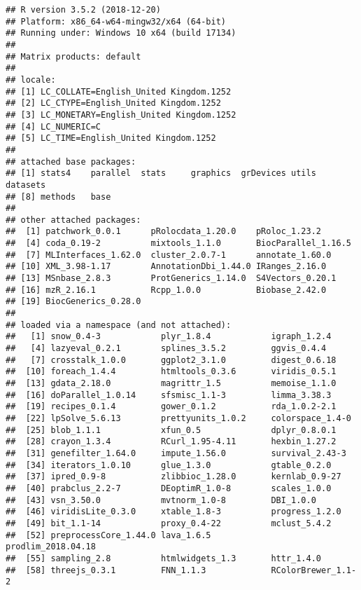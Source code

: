 \documentclass[]{article}
\begin{document}
\begin{verbatim}
## R version 3.5.2 (2018-12-20)
## Platform: x86_64-w64-mingw32/x64 (64-bit)
## Running under: Windows 10 x64 (build 17134)
## 
## Matrix products: default
## 
## locale:
## [1] LC_COLLATE=English_United Kingdom.1252 
## [2] LC_CTYPE=English_United Kingdom.1252   
## [3] LC_MONETARY=English_United Kingdom.1252
## [4] LC_NUMERIC=C                           
## [5] LC_TIME=English_United Kingdom.1252    
## 
## attached base packages:
## [1] stats4    parallel  stats     graphics  grDevices utils     datasets 
## [8] methods   base     
## 
## other attached packages:
##  [1] patchwork_0.0.1      pRolocdata_1.20.0    pRoloc_1.23.2       
##  [4] coda_0.19-2          mixtools_1.1.0       BiocParallel_1.16.5 
##  [7] MLInterfaces_1.62.0  cluster_2.0.7-1      annotate_1.60.0     
## [10] XML_3.98-1.17        AnnotationDbi_1.44.0 IRanges_2.16.0      
## [13] MSnbase_2.8.3        ProtGenerics_1.14.0  S4Vectors_0.20.1    
## [16] mzR_2.16.1           Rcpp_1.0.0           Biobase_2.42.0      
## [19] BiocGenerics_0.28.0 
## 
## loaded via a namespace (and not attached):
##   [1] snow_0.4-3            plyr_1.8.4            igraph_1.2.4         
##   [4] lazyeval_0.2.1        splines_3.5.2         ggvis_0.4.4          
##   [7] crosstalk_1.0.0       ggplot2_3.1.0         digest_0.6.18        
##  [10] foreach_1.4.4         htmltools_0.3.6       viridis_0.5.1        
##  [13] gdata_2.18.0          magrittr_1.5          memoise_1.1.0        
##  [16] doParallel_1.0.14     sfsmisc_1.1-3         limma_3.38.3         
##  [19] recipes_0.1.4         gower_0.1.2           rda_1.0.2-2.1        
##  [22] lpSolve_5.6.13        prettyunits_1.0.2     colorspace_1.4-0     
##  [25] blob_1.1.1            xfun_0.5              dplyr_0.8.0.1        
##  [28] crayon_1.3.4          RCurl_1.95-4.11       hexbin_1.27.2        
##  [31] genefilter_1.64.0     impute_1.56.0         survival_2.43-3      
##  [34] iterators_1.0.10      glue_1.3.0            gtable_0.2.0         
##  [37] ipred_0.9-8           zlibbioc_1.28.0       kernlab_0.9-27       
##  [40] prabclus_2.2-7        DEoptimR_1.0-8        scales_1.0.0         
##  [43] vsn_3.50.0            mvtnorm_1.0-8         DBI_1.0.0            
##  [46] viridisLite_0.3.0     xtable_1.8-3          progress_1.2.0       
##  [49] bit_1.1-14            proxy_0.4-22          mclust_5.4.2         
##  [52] preprocessCore_1.44.0 lava_1.6.5            prodlim_2018.04.18   
##  [55] sampling_2.8          htmlwidgets_1.3       httr_1.4.0           
##  [58] threejs_0.3.1         FNN_1.1.3             RColorBrewer_1.1-2   

\end{verbatim}
\end{document}
